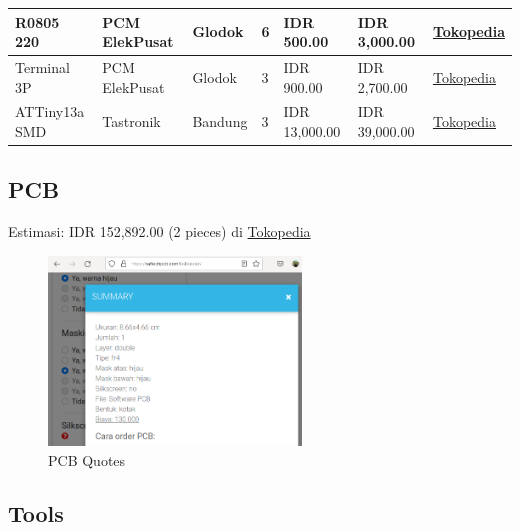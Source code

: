\documentclass[a4paper,12pt,oneside,pdflatex,italian,final,twocolumn]{article}
\begin{document}
\begin{table}[!ht]
\begin{tabular}{|l|l|l|l|l|l|l|}
			R0805 220 & PCM ElekPusat & Glodok & 6 & IDR 500.00 & IDR 3,000.00 & \href{https://www.tokopedia.com/pcmelektronik/resistor-smd-0805-221-220-ohm}{Tokopedia} \\ \hline
			Terminal 3P & PCM ElekPusat & Glodok & 3 & IDR 900.00 & IDR 2,700.00 & \href{https://www.tokopedia.com/pcmelektronik/terminal-pcb-block-screw-3pin-kf301}{Tokopedia} \\ \hline
			ATTiny13a SMD & Tastronik & Bandung & 3 & IDR 13,000.00 & IDR 39,000.00 & \href{https://www.tokopedia.com/tastronik/attiny13a-ssu-smd-attiny-13-attiny13-atmega-avr-marking-tipe-2}{Tokopedia} \\ \hline
		\end{tabular}
	\end{table}
	
	\newpage
	\subsection{PCB}
	
	Estimasi: IDR 152,892.00 (2 pieces) di \href{https://www.tokopedia.com/raftech/jasa-cetak-pcb-general}{Tokopedia}
	
	\begin{figure}[h]
		\centering
		\includegraphics[width=0.6\textwidth]{images/pcb_quotes.png}
		\caption{PCB Quotes}
	\end{figure}
	
	\subsection{Tools}
	
\end{document}
